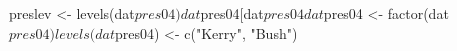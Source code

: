 \begin{Schunk}
\begin{Sinput}
 preslev <- levels(dat$pres04)
 dat$pres04[dat$pres04 %in% preslev[3:10]]<- NA
 dat$pres04 <- factor(dat$pres04)
 levels(dat$pres04) <- c("Kerry", "Bush")
\end{Sinput}
\end{Schunk}
